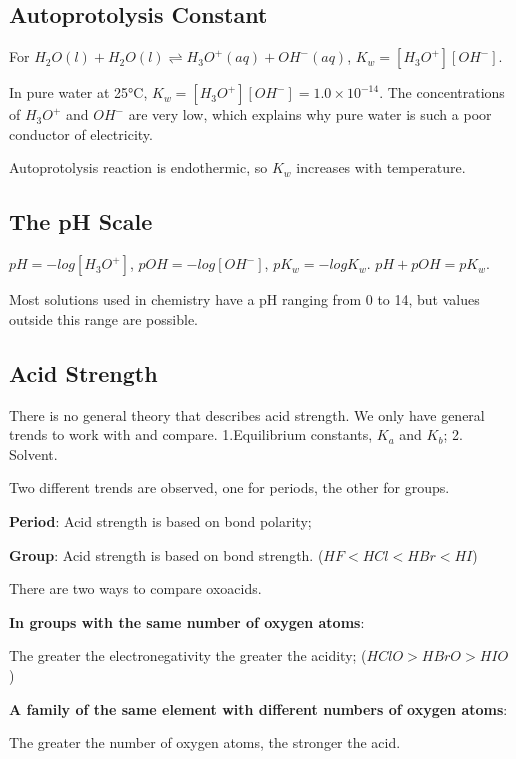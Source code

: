 \documentclass[a4paper,12pt]{article}
\begin{document}
\subsection{Autoprotolysis Constant}
For $H_{2}O(l) + H_{2}O(l) \rightleftharpoons H_{3}O^{+}(aq) + OH^{-}(aq)$, $K_{w}=[H_{3}O^{+}][OH^{-}]$.\par
In pure water at 25°C, $K_{w}=[H_{3}O^{+}][OH^{-}]=1.0\times 10^{-14}$. The concentrations of $H_{3}O^{+}$ and $OH^{-}$ are very low, which explains why pure water is such a poor conductor of electricity.\par
Autoprotolysis reaction is endothermic, so $K_{w}$ increases with temperature.
\subsection{The pH Scale}
$pH = -log [H_{3}O^{+}]$, $pOH = -log [OH^{-}]$, $pK_{w} = - log K_{w}$. $pH+pOH=pK_{w}$.\par
Most solutions used in chemistry have a pH ranging from 0 to 14, but values outside this range are possible.\par
\subsection{Acid Strength}
There is no general theory that describes acid strength. We only have general trends to work with and compare. 1.Equilibrium constants, $K_{a}$ and $K_{b}$; 2. Solvent.\par
Two different trends are observed, one for periods, the other for groups.\par
\textbf{Period}: Acid strength is based on bond polarity;\par
\textbf{Group}: Acid strength is based on bond strength. ($HF<HCl<HBr<HI$)\par
There are two ways to compare oxoacids.\par
\textbf{In groups with the same number of oxygen atoms}:\par The greater the electronegativity the greater the acidity; ($HClO > HBrO > HIO$)\par
\textbf{A family of the same element with different numbers of oxygen atoms}:\par The greater the number of oxygen atoms, the stronger the acid.
\end{document}
